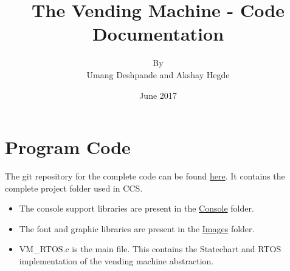 \documentclass{article}
\title{The Vending Machine - Code Documentation}
\author{By \\ Umang Deshpande and Akshay Hegde}
\date{June 2017}
\begin{document}
\maketitle

\section{Program Code}
\qquad The git repository for the complete code can be found \href{https://github.com/eYSIP-2017/eYSIP-2017_Game_Development-TI-RTOS/tree/master/VendingMachine_Final}{here}. It contains the complete project folder used in CCS. 
\begin{itemize}
  \item The console support libraries are present in the \href{https://github.com/eYSIP-2017/eYSIP-2017_Game_Development-TI-RTOS/tree/master/VendingMachine_Final/Console}{Console} folder. 
  \item The font and graphic libraries are present in the \href{https://github.com/eYSIP-2017/eYSIP-2017_Game_Development-TI-RTOS/tree/master/VendingMachine_Final/Images}{Images} folder.
  \item VM\_RTOS.c is the main file. This contains the Statechart and RTOS implementation of the vending machine abstraction.
\end{itemize}
\end{document}
